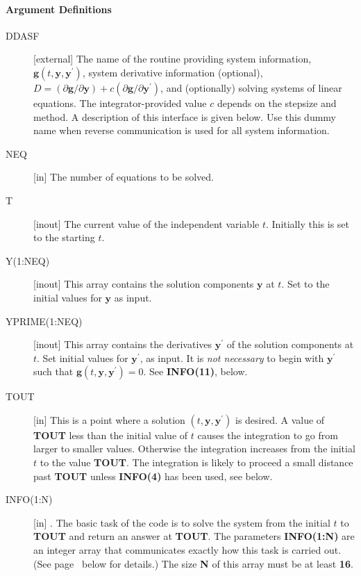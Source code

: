 \documentclass[twoside]{MATH77}
\begin{document}
\paragraph{Argument Definitions \label{ArgDefs}}
\begin{description}
\item[DDASF][external] The name of the routine providing system information,
  $\mathbf{g}(t,\mathbf{y},\mathbf{y}^{\prime})$, system derivative
  information (optional), $D=(\partial \mathbf{g}/\partial \mathbf{y})+c
  (\partial \mathbf{g}/\partial \mathbf{y}^{\prime})$, and (optionally)
  solving systems of linear equations.  The integrator-provided value $c$
  depends on the stepsize and method.  A description of this interface is
  given below.  Use this dummy name when reverse communication is used for all
  system information.

\item[NEQ]  [in] The number of equations to be solved.

\item[T]  [inout] The current value of the independent variable $t$.
  Initially this is set to the starting $t.$
  
\item[Y(1:NEQ)] [inout] This array contains the solution components
  $\mathbf{y}$ at $t$.  Set to the initial values for $\mathbf{y}$ as input.
  
\item[YPRIME(1:NEQ)] [inout] This array contains the derivatives
  $\mathbf{y}^{\prime}$ of the solution components at $t$.  Set initial values
  for $\mathbf{y}^{\prime}$, as input.  It is \emph{not necessary} to begin
  with $\mathbf{y}^{\prime}$ such that
  $\mathbf{g}(t,\mathbf{y},\mathbf{y}^{\prime})=0.$ See \textbf{INFO(11)},
  below.

\item[TOUT] [in] This is a point where a solution $(t,\mathbf{y},\mathbf{y}^{\prime})$ is
  desired.  A value of \textbf{TOUT} less than the initial value of $t$ causes
  the integration to go from larger to smaller values.  Otherwise the
  integration increases from the initial $t$ to the value \textbf{TOUT}.  The
  integration is likely to proceed a small distance past \textbf{TOUT} unless
  \textbf{INFO(4)} has been used, see below.

\item[INFO(1:N)] [in] . The basic task of the code is to solve the system from
  the initial $t$ to \textbf{TOUT} and return an answer at \textbf{TOUT}. The
  parameters \textbf{INFO(1:N)} are an integer array that communicates exactly
  how this task is carried out. (See page~\pageref{INFO} below for details.)  
  The size \textbf{N} of this array must be at least \textbf{16}.
  

\end{description}
\end{document}
